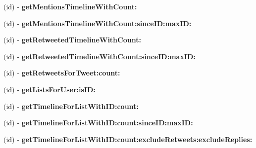 \begin{DoxyCompactItemize}
\item 
\mbox{\label{interfaceFHSTwitterEngine_a1474b8f247bf67d039dcffff80df3d01}} 
(id) -\/ {\bfseries get\+Mentions\+Timeline\+With\+Count\+:}
\item 
\mbox{\label{interfaceFHSTwitterEngine_accecfee8c4d722d8000372a6ee0a3012}} 
(id) -\/ {\bfseries get\+Mentions\+Timeline\+With\+Count\+:since\+I\+D\+:max\+I\+D\+:}
\item 
\mbox{\label{interfaceFHSTwitterEngine_a7c6c5babde2d75727f018f66dea0e2b9}} 
(id) -\/ {\bfseries get\+Retweeted\+Timeline\+With\+Count\+:}
\item 
\mbox{\label{interfaceFHSTwitterEngine_ac129755f688cc0c081d65802dc482a43}} 
(id) -\/ {\bfseries get\+Retweeted\+Timeline\+With\+Count\+:since\+I\+D\+:max\+I\+D\+:}
\item 
\mbox{\label{interfaceFHSTwitterEngine_ab4085e8c987256e812a8e9615d240403}} 
(id) -\/ {\bfseries get\+Retweets\+For\+Tweet\+:count\+:}
\item 
\mbox{\label{interfaceFHSTwitterEngine_aa36af5f383847925ee01b27b64b1cce4}} 
(id) -\/ {\bfseries get\+Lists\+For\+User\+:is\+I\+D\+:}
\item 
\mbox{\label{interfaceFHSTwitterEngine_ad9b79983a8d1394bcd2ab2f8da812e21}} 
(id) -\/ {\bfseries get\+Timeline\+For\+List\+With\+I\+D\+:count\+:}
\item 
\mbox{\label{interfaceFHSTwitterEngine_a5140141db90bef9f8bbcb0a4c3e6e582}} 
(id) -\/ {\bfseries get\+Timeline\+For\+List\+With\+I\+D\+:count\+:since\+I\+D\+:max\+I\+D\+:}
\item 
\mbox{\label{interfaceFHSTwitterEngine_a70e86c4f818463394d17d58a3f185505}} 
(id) -\/ {\bfseries get\+Timeline\+For\+List\+With\+I\+D\+:count\+:exclude\+Retweets\+:exclude\+Replies\+:}
\item 
\mbox{\label{interfaceFHSTwitterEngine_a36e3e96842e652b0920da8b1904f8d5c}} 

\end{DoxyCompactItemize}
